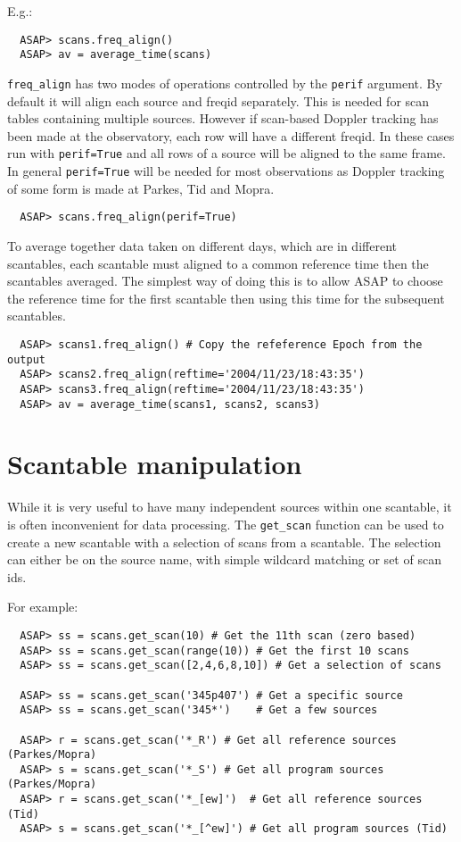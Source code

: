\documentclass[11pt]{article}
\newcommand{\cmd}[1]{{\tt #1}}
\begin{document}
E.g.:

\begin{verbatim}
  ASAP> scans.freq_align()
  ASAP> av = average_time(scans)
\end{verbatim}

\cmd{freq\_align} has two modes of operations controlled by the
\cmd{perif} argument. By default it will align each source and freqid
separately. This is needed for scan tables containing multiple
sources. However if scan-based Doppler tracking has been made at the observatory,
each row will have a different freqid. In these cases run with
\cmd{perif=True} and all rows of a source will be aligned to the same
frame. In general \cmd{perif=True} will be needed for most
observations as Doppler tracking of some form is made at Parkes, Tid
and Mopra.

\begin{verbatim}
  ASAP> scans.freq_align(perif=True)
\end{verbatim}

To average together data taken on different days, which are in
different scantables, each scantable must aligned to a common
reference time then the scantables averaged. The simplest way of
doing this is to allow ASAP to choose the reference time for the first
scantable then using this time for the subsequent scantables. 

\begin{verbatim}
  ASAP> scans1.freq_align() # Copy the refeference Epoch from the output
  ASAP> scans2.freq_align(reftime='2004/11/23/18:43:35')
  ASAP> scans3.freq_align(reftime='2004/11/23/18:43:35')
  ASAP> av = average_time(scans1, scans2, scans3)
\end{verbatim}

\section{Scantable manipulation}

While it is very useful to have many independent sources within one
scantable, it is often inconvenient for data processing. The
\cmd{get\_scan} function can be used to create a new scantable with a
selection of scans from a scantable. The selection can either be on
the source name, with simple wildcard matching or set of scan ids.

For example:

\begin{verbatim}
  ASAP> ss = scans.get_scan(10) # Get the 11th scan (zero based)
  ASAP> ss = scans.get_scan(range(10)) # Get the first 10 scans
  ASAP> ss = scans.get_scan([2,4,6,8,10]) # Get a selection of scans

  ASAP> ss = scans.get_scan('345p407') # Get a specific source
  ASAP> ss = scans.get_scan('345*')    # Get a few sources

  ASAP> r = scans.get_scan('*_R') # Get all reference sources (Parkes/Mopra)
  ASAP> s = scans.get_scan('*_S') # Get all program sources (Parkes/Mopra)
  ASAP> r = scans.get_scan('*_[ew]')  # Get all reference sources (Tid)
  ASAP> s = scans.get_scan('*_[^ew]') # Get all program sources (Tid)

\end{verbatim}
\end{document}
